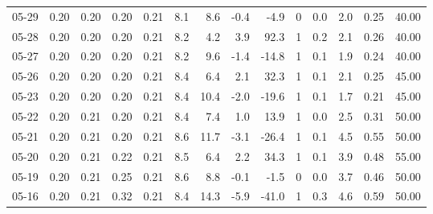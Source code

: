 \begin{threeparttable}
{\begin{tabular}{lrrrrrrrrrrrrr}
  05-29 &          0.20 &          0.20 &          0.20 &        0.21 &                 8.1 &                 8.6 &       -0.4 &         -4.9 &              0 &                 0.0 &              2.0 &            0.25 &                  40.00 \\
  05-28 &          0.20 &          0.20 &          0.20 &        0.21 &                 8.2 &                 4.2 &        3.9 &         92.3 &              1 &                 0.2 &              2.1 &            0.26 &                  40.00 \\
  05-27 &          0.20 &          0.20 &          0.20 &        0.21 &                 8.2 &                 9.6 &       -1.4 &        -14.8 &              1 &                 0.1 &              1.9 &            0.24 &                  40.00 \\
  05-26 &          0.20 &          0.20 &          0.20 &        0.21 &                 8.4 &                 6.4 &        2.1 &         32.3 &              1 &                 0.1 &              2.1 &            0.25 &                  45.00 \\
  05-23 &          0.20 &          0.20 &          0.20 &        0.21 &                 8.4 &                10.4 &       -2.0 &        -19.6 &              1 &                 0.1 &              1.7 &            0.21 &                  45.00 \\
  05-22 &          0.20 &          0.21 &          0.20 &        0.21 &                 8.4 &                 7.4 &        1.0 &         13.9 &              1 &                 0.0 &              2.5 &            0.31 &                  50.00 \\
  05-21 &          0.20 &          0.21 &          0.20 &        0.21 &                 8.6 &                11.7 &       -3.1 &        -26.4 &              1 &                 0.1 &              4.5 &            0.55 &                  50.00 \\
  05-20 &          0.20 &          0.21 &          0.22 &        0.21 &                 8.5 &                 6.4 &        2.2 &         34.3 &              1 &                 0.1 &              3.9 &            0.48 &                  55.00 \\
  05-19 &          0.20 &          0.21 &          0.25 &        0.21 &                 8.6 &                 8.8 &       -0.1 &         -1.5 &              0 &                 0.0 &              3.7 &            0.46 &                  50.00 \\
  05-16 &          0.20 &          0.21 &          0.32 &        0.21 &                 8.4 &                14.3 &       -5.9 &        -41.0 &              1 &                 0.3 &              4.6 &            0.59 &                  50.00 \\

\end{tabular}}
\end{threeparttable}
